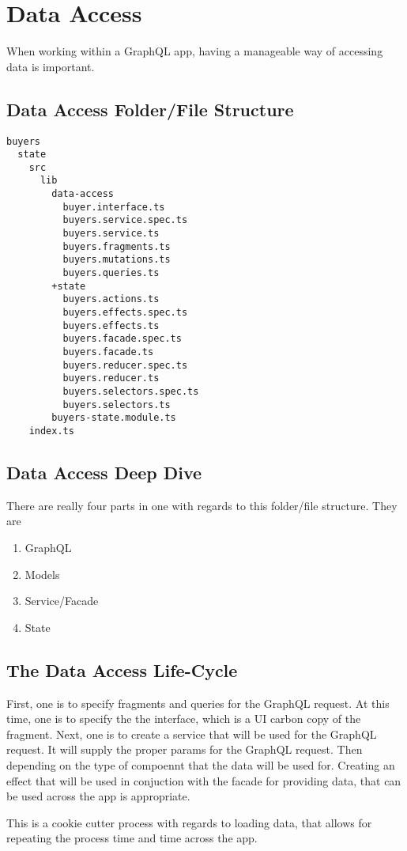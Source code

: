 \maketitle{}
\section{ Data Access }
When working within a GraphQL app, having a manageable way of accessing data
is important.

\subsection{ Data Access Folder/File Structure}
\begin{verbatim}
buyers
  state
    src
      lib
        data-access
          buyer.interface.ts
          buyers.service.spec.ts
          buyers.service.ts
          buyers.fragments.ts
          buyers.mutations.ts
          buyers.queries.ts
        +state
          buyers.actions.ts
          buyers.effects.spec.ts
          buyers.effects.ts
          buyers.facade.spec.ts
          buyers.facade.ts
          buyers.reducer.spec.ts
          buyers.reducer.ts
          buyers.selectors.spec.ts
          buyers.selectors.ts
        buyers-state.module.ts
    index.ts
\end{verbatim}
\subsection{ Data Access Deep Dive}
There are really four parts in one with regards to this folder/file structure.
They are
\begin{enumerate}
  \item GraphQL
  \item Models
  \item Service/Facade
  \item State
\end{enumerate}

\subsection{ The Data Access Life-Cycle}
First, one is to specify fragments and queries for the GraphQL request. At this
time, one is to specify the the interface, which is a UI carbon copy of the
fragment. Next, one is to create a service that will be used for the GraphQL
request. It will supply the proper params for the GraphQL request. Then depending
on the type of compoennt that the data will be used for. Creating an effect
that will be used in conjuction with the facade for providing data, that can be
used across the app is appropriate.

This is a cookie cutter process with regards to loading data, that allows for
repeating the process time and time across the app.
